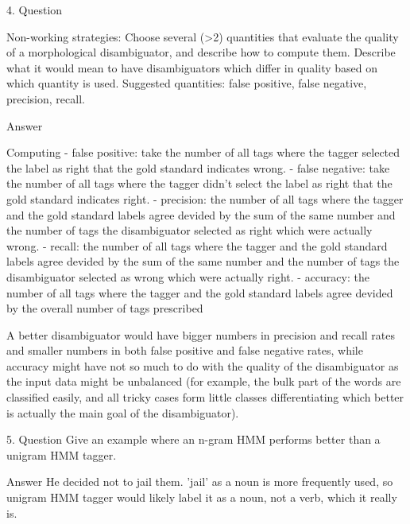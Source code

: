  
 4. Question

Non-working strategies:
Choose several (>2) quantities that evaluate the quality of a morphological disambiguator, and describe how to compute them. Describe what it would mean to have disambiguators which differ in quality based on which quantity is used.
Suggested quantities: false positive, false negative, precision, recall.

Answer

Computing
- false positive: take the number of all tags where the tagger selected the label as right that the gold standard indicates wrong.
- false negative: take the number of all tags where the tagger didn't select the label as right that the gold standard indicates right.
- precision: the number of all tags where the tagger and the gold standard labels agree devided by the sum of the same number and the number of tags the disambiguator selected as right which were actually wrong.
- recall: the number of all tags where the tagger and the gold standard labels agree devided by the sum of the same number and the number of tags the disambiguator selected as wrong which were actually right.
- accuracy: the number of all tags where the tagger and the gold standard labels agree devided by the overall number of tags prescribed

A better disambiguator would have bigger numbers in precision and recall rates and smaller numbers in both false positive and false negative rates, while accuracy might have not so much to do with the quality of the disambiguator as the input data might be unbalanced (for example, the bulk part of the words are classified easily, and all tricky cases form little classes differentiating which better is actually the main goal of the disambiguator).

5. Question
Give an example where an n-gram HMM performs better than a unigram HMM tagger.

Answer
He decided not to jail them.
'jail' as a noun is more frequently used, so unigram HMM tagger would likely label it as a noun, not a verb, which it really is. 


